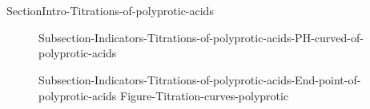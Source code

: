 \documentclass[main.tex]{subfiles}
\newcommand\chapterlabel{Ch-acidbase}\setcounter{figurenewcounter}{0}\setcounter{tablenewcounter}{0}\setcounter{formulanewcounter}{0}\chapterpicture{../{\chapterlabel}/figure1}\chapterpicturelabel{PngImg}
\begin{document}
{\section{\color{blue!30!black}{Titrations of polyprotic acids}}{SectionIntro-Titrations-of-polyprotic-acids}
\sloppy\begin{description}
\item[] {Subsection-Indicators-Titrations-of-polyprotic-acids-PH-curved-of-polyprotic-acids}
\item[] {Subsection-Indicators-Titrations-of-polyprotic-acids-End-point-of-polyprotic-acids}
 {Figure-Titration-curves-polyprotic}
 \end{description}
}
 
\checkoddpage\ifoddpage \clearpage\thispagestyle{empty}\mbox{}\clearpage \else  \fi 
\end{document}
